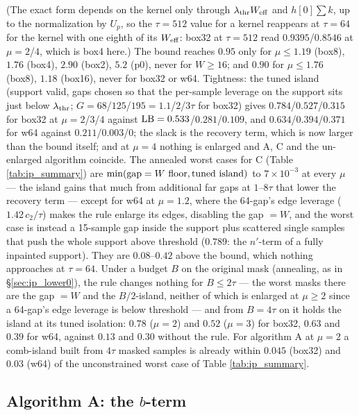\documentclass{article}
\numberwithin{equation}{section}   %
\begin{document}
(The exact form depends on the kernel only through $\lambda_{\rm thr}W_{\rm eff}$ and $h[0]\sum k$, up
to the normalization by $U_p$, so the $\tau = 512$ value for a kernel reappears at $\tau = 64$ for the
kernel with one eighth of its $W_{\rm eff}$: box32 at $\tau = 512$ read $0.9395$/$0.8546$ at $\mu = 2$/$4$,
which is box4 here.)  The bound reaches $0.95$ only for $\mu \le 1.19$ (box8), $1.76$ (box4), $2.90$
(box2), $5.2$ (p0), never for $W \ge 16$; and $0.90$ for $\mu \le 1.76$ (box8), $1.18$ (box16), never for
box32 or w64.  Tightness: the tuned island (support valid, gaps chosen so that the per-sample leverage on
the support sits just below $\lambda_{\rm thr}$; $G = 68$/$125$/$195 = 1.1$/$2$/$3\tau$ for box32) gives
$0.784$/$0.527$/$0.315$ for box32 at $\mu = 2$/$3$/$4$ against ${\rm LB} = 0.533$/$0.281$/$0.109$, and
$0.634$/$0.394$/$0.371$ for w64 against $0.211$/$0.003$/$0$; the slack is the recovery term, which is now
larger than the bound itself; and at $\mu = 4$ nothing is enlarged and A, C and the un-enlarged algorithm
coincide.  The annealed worst cases for C (Table \ref{tab:ip_summary}) are
$\min({\rm gap} = W \mbox{ floor}, \mbox{tuned island})$ to $7 \times 10^{-3}$ at every $\mu$ --- the
island gains that much from additional far gaps at $1$--$8\tau$ that lower the recovery term --- except
for w64 at $\mu = 1.2$, where the 64-gap's edge leverage ($1.42\,c_2/\tau$) makes the rule enlarge its
edges, disabling the gap $= W$, and the worst case is instead a 15-sample gap inside the support plus
scattered single samples that push the whole support above threshold ($0.789$: the $n'$-term of a fully
inpainted support).  They are $0.08$--$0.42$ above the bound, which nothing approaches at $\tau = 64$.
Under a budget $B$ on the original mask (annealing, as in \S\ref{sec:ip_lower0}), the rule changes
nothing for $B \le 2\tau$ --- the worst masks there are the gap $= W$ and the $B/2$-island, neither of
which is enlarged at $\mu \ge 2$ since a 64-gap's edge leverage is below threshold --- and from
$B = 4\tau$ on it holds the island at its tuned isolation: $0.78$ ($\mu = 2$) and $0.52$ ($\mu = 3$) for
box32, $0.63$ and $0.39$ for w64, against $0.13$ and $0.30$ without the rule.  For algorithm A at
$\mu = 2$ a comb-island built from $4\tau$ masked samples is already within $0.045$ (box32) and $0.03$
(w64) of the unconstrained worst case of Table \ref{tab:ip_summary}.

\subsection{Algorithm A: the $b$-term}
\label{sec:ip_bterm}
\end{document}
